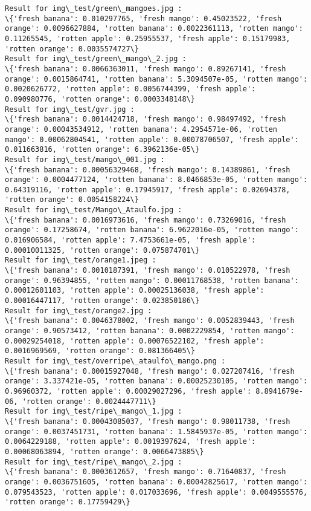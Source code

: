 \documentclass[11pt]{article}
\begin{document}
\begin{Verbatim}[commandchars=\\\{\}]
Result for img\_test/green\_mangoes.jpg :
\{'fresh banana': 0.010297765, 'fresh mango': 0.45023522, 'fresh orange': 0.0096627884, 'rotten banana': 0.0022361113, 'rotten mango': 0.11265545, 'rotten apple': 0.25955537, 'fresh apple': 0.15179983, 'rotten orange': 0.0035574727\}
Result for img\_test/green\_mango\_2.jpg :
\{'fresh banana': 0.0066363011, 'fresh mango': 0.89267141, 'fresh orange': 0.0015864741, 'rotten banana': 5.3094507e-05, 'rotten mango': 0.0020626772, 'rotten apple': 0.0056744399, 'fresh apple': 0.090980776, 'rotten orange': 0.0003348148\}
Result for img\_test/gvr.jpg :
\{'fresh banana': 0.0014424718, 'fresh mango': 0.98497492, 'fresh orange': 0.00043534912, 'rotten banana': 4.2954571e-06, 'rotten mango': 0.00062804541, 'rotten apple': 0.00078706507, 'fresh apple': 0.011663816, 'rotten orange': 6.3962136e-05\}
Result for img\_test/mango\_001.jpg :
\{'fresh banana': 0.00056329468, 'fresh mango': 0.14389861, 'fresh orange': 0.0004477124, 'rotten banana': 8.0466853e-05, 'rotten mango': 0.64319116, 'rotten apple': 0.17945917, 'fresh apple': 0.02694378, 'rotten orange': 0.0054158224\}
Result for img\_test/Mango\_Ataulfo.jpg :
\{'fresh banana': 0.0016973616, 'fresh mango': 0.73269016, 'fresh orange': 0.17258674, 'rotten banana': 6.9622016e-05, 'rotten mango': 0.016906584, 'rotten apple': 7.4753661e-05, 'fresh apple': 0.00010011325, 'rotten orange': 0.075874701\}
Result for img\_test/orange1.jpeg :
\{'fresh banana': 0.0010187391, 'fresh mango': 0.010522978, 'fresh orange': 0.96394855, 'rotten mango': 0.00011768538, 'rotten banana': 0.00012601103, 'rotten apple': 0.00025136038, 'fresh apple': 0.00016447117, 'rotten orange': 0.023850186\}
Result for img\_test/orange2.jpg :
\{'fresh banana': 0.0046378002, 'fresh mango': 0.0052839443, 'fresh orange': 0.90573412, 'rotten banana': 0.0002229854, 'rotten mango': 0.00029254018, 'rotten apple': 0.00076522102, 'fresh apple': 0.0016969569, 'rotten orange': 0.081366405\}
Result for img\_test/overripe\_ataulfo\_mango.png :
\{'fresh banana': 0.00015927048, 'fresh mango': 0.027207416, 'fresh orange': 3.337421e-05, 'rotten banana': 0.00025230105, 'rotten mango': 0.96960372, 'rotten apple': 0.00029027296, 'fresh apple': 8.8941679e-06, 'rotten orange': 0.0024447711\}
Result for img\_test/ripe\_mango\_1.jpg :
\{'fresh banana': 0.00043085037, 'fresh mango': 0.98011738, 'fresh orange': 0.0037451731, 'rotten banana': 1.5845937e-05, 'rotten mango': 0.0064229188, 'rotten apple': 0.0019397624, 'fresh apple': 0.00068063894, 'rotten orange': 0.0066473885\}
Result for img\_test/ripe\_mango\_2.jpg :
\{'fresh banana': 0.0003612657, 'fresh mango': 0.71640837, 'fresh orange': 0.0036751605, 'rotten banana': 0.00042825617, 'rotten mango': 0.079543523, 'rotten apple': 0.017033696, 'fresh apple': 0.0049555576, 'rotten orange': 0.17759429\}

\end{Verbatim}
\end{document}
